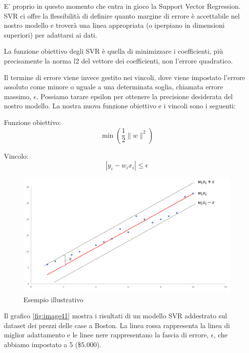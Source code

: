 E' proprio in questo momento che entra in gioco la Support Vector Regression. SVR ci offre la flessibilità di definire quanto margine di errore è accettabile nel nostro modello e troverà una linea appropriata (o iperpiano in dimensioni superiori) per adattarsi ai dati.

La funzione obiettivo degli SVR è quella di minimizzare i coefficienti, più precisamente la norma l2 del vettore dei coefficienti, non l'errore quadratico. 

Il termine di errore viene invece gestito nei vincoli, dove viene impostato l'errore assoluto come minore o uguale a una determinata soglia, chiamata errore massimo, $\epsilon$. 
Possiamo tarare epsilon per ottenere la precisione desiderata del nostro modello. La nostra nuova funzione obiettivo e i vincoli sono i seguenti:

Funzione obiettivo:
\begin{equation}
        \min \left( \frac{1}{2} \| w \|^{2} \right)
\end{equation}

Vincolo:
\begin{equation}
        | y_i - w_i x_i | \leq \epsilon 
\end{equation}

\begin{figure}
    \centering
    \includegraphics[width=0.7\linewidth]{images/img102.png}
    \caption{Esempio illustrativo}
\end{figure}


Il grafico \ref{fig:image41} mostra i risultati di un modello SVR addestrato sul dataset dei prezzi delle case a Boston. 
La linea rossa rappresenta la linea di miglior adattamento e le linee nere rappresentano la fascia di errore, $\epsilon$, che abbiamo impostato a 5 (\$5.000).


